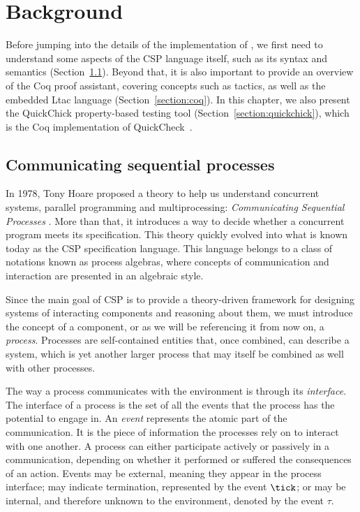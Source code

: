 \chapter{Background}
\label{chapter:background}

Before jumping into the details of the implementation of \CSPcoq{}, we first need to understand some aspects of the CSP language itself, such as its syntax and semantics (Section~\ref{section:csp}). Beyond that, it is also important to provide an overview of the Coq proof assistant, covering concepts such as tactics, as well as the embedded Ltac language (Section~\ref{section:coq}). In this chapter, we also present the QuickChick property-based testing tool (Section~\ref{section:quickchick}), which is the Coq implementation of QuickCheck~\cite{hughes:quickcheck2000}.

\section{Communicating sequential processes}
\label{section:csp}

In 1978, Tony Hoare proposed a theory to help us understand concurrent systems, parallel programming and multiprocessing: \emph{Communicating Sequential Processes} \cite{hoare:csp}. More than that, it introduces a way to decide whether a concurrent program meets its specification. This theory quickly evolved into what is known today as the CSP specification language. This language belongs to a class of notations known as process algebras, where concepts of communication and interaction are presented in an algebraic style.

Since the main goal of CSP is to provide a theory-driven framework for designing systems of interacting components and reasoning about them, we must introduce the concept of a component, or as we will be referencing it from now on, a \emph{process}. Processes are self-contained entities that, once combined, can describe a system, which is yet another larger process that may itself be combined as well with other processes.

The way a process communicates with the environment is through its \emph{interface}. The interface of a process is the set of all the events that the process has the potential to engage in. An \emph{event} represents the atomic part of the communication. It is the piece of information the processes rely on to interact with one another. A process can either participate actively or passively in a communication, depending on whether it performed or suffered the consequences of an action. Events may be external, meaning they appear in the process interface; may indicate termination, represented by the event $ \tick $; or may be internal, and therefore unknown to the environment, denoted by the event $ \tau $.

